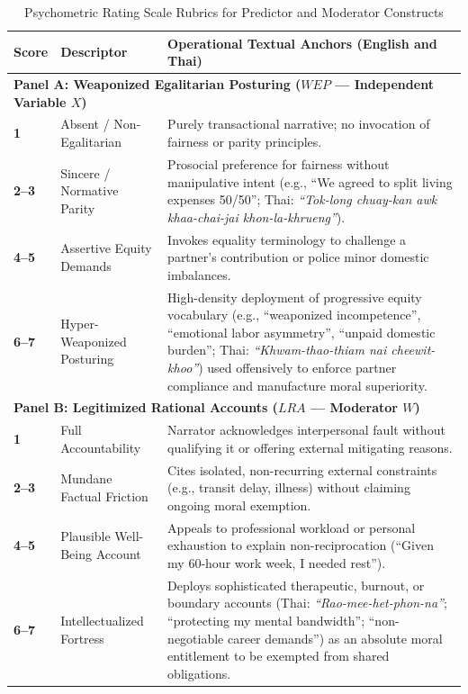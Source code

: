 \documentclass[11pt,a4paper]{article}
\begin{document}
\begin{table}[htbp]
\centering
\small
\caption{Psychometric Rating Scale Rubrics for Predictor and Moderator Constructs}
\label{tab:supp_rubric_wep_lra}
\begin{tabularx}{\textwidth}{p{1.2cm}p{3.5cm}X}
\toprule
\textbf{Score} & \textbf{Descriptor} & \textbf{Operational Textual Anchors (English and Thai)} \\
\midrule
\multicolumn{3}{l}{\textbf{Panel A: Weaponized Egalitarian Posturing ($WEP$ --- Independent Variable $X$)}} \\
\midrule
\textbf{1} & Absent / Non-Egalitarian & Purely transactional narrative; no invocation of fairness or parity principles. \\
\textbf{2--3} & Sincere / Normative Parity & Prosocial preference for fairness without manipulative intent (e.g., ``We agreed to split living expenses 50/50''; Thai: \textit{``Tok-long chuay-kan awk khaa-chai-jai khon-la-khrueng''}). \\
\textbf{4--5} & Assertive Equity Demands & Invokes equality terminology to challenge a partner's contribution or police minor domestic imbalances. \\
\textbf{6--7} & Hyper-Weaponized Posturing & High-density deployment of progressive equity vocabulary (e.g., ``weaponized incompetence'', ``emotional labor asymmetry'', ``unpaid domestic burden''; Thai: \textit{``Khwam-thao-thiam nai cheewit-khoo''}) used offensively to enforce partner compliance and manufacture moral superiority. \\
\midrule
\multicolumn{3}{l}{\textbf{Panel B: Legitimized Rational Accounts ($LRA$ --- Moderator $W$)}} \\
\midrule
\textbf{1} & Full Accountability & Narrator acknowledges interpersonal fault without qualifying it or offering external mitigating reasons. \\
\textbf{2--3} & Mundane Factual Friction & Cites isolated, non-recurring external constraints (e.g., transit delay, illness) without claiming ongoing moral exemption. \\
\textbf{4--5} & Plausible Well-Being Account & Appeals to professional workload or personal exhaustion to explain non-reciprocation (``Given my 60-hour work week, I needed rest''). \\
\textbf{6--7} & Intellectualized Fortress & Deploys sophisticated therapeutic, burnout, or boundary accounts (Thai: \textit{``Rao-mee-het-phon-na''}; ``protecting my mental bandwidth''; ``non-negotiable career demands'') as an absolute moral entitlement to be exempted from shared obligations. \\
\bottomrule
\end{tabularx}
\end{table}
\end{document}
